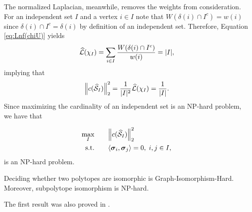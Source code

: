 The normalized Laplacian, meanwhile, removes the weights from consideration. For an independent set $I$ and a vertex $i\in I$ note that $W(\delta(i)\cap I^c)=w(i)$ since $\delta(i)\cap I^c=\delta(i)$ by definition of an independent set. Therefore, Equation \eqref{eq:Lnf(chiU)} yields 
\begin{align*}
    \widehat{\mathcal{L}}(\chi_I)=\sum_{i\in I}\frac{W(\delta(i)\cap I^c)}{w(i)} = |I|,
\end{align*}
implying that 
\[\norm{c(\widehat{\mathcal{S}}_I)}_2^2=\frac{1}{|I|^2}\widehat{\mathcal{L}}(\chi_I)=\frac{1}{|I|}.\]
Since maximizing the cardinality of an independent set is an NP-hard problem, we have that 

\begin{alignat*}{2}
\max_I & \quad &&  \norm{c(\widehat{\mathcal{S}}_I)}_2^2 \\
 \text{s.t.}&  &&  \langle \vb*{\sigma}_i,\vb*{\sigma}_j\rangle=0,\; i,j\in I,
\end{alignat*}
is an NP-hard problem.


\begin{theorem}
Deciding whether two polytopes are isomorphic is Graph-Isomorphism-Hard. Moreover, subpolytope isomorphism is NP-hard. 
\end{theorem}

The first result was also proved in \cite{kaibel2008complexity}. 


